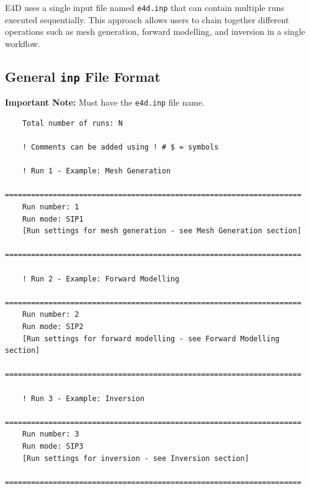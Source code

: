 \documentclass[a4paper,12pt]{article}
\begin{document}
E4D uses a single input file named \texttt{e4d.inp} that can contain multiple runs executed sequentially. This approach allows users to chain together different operations such as mesh generation, forward modelling, and inversion in a single workflow.

\subsection{General \texttt{inp} File Format}

\begin{framed}
    \noindent \textbf{Important Note:} Must have the \texttt{e4d.inp} file name.
\end{framed}

\begin{framed}
    \begin{verbatim}
    Total number of runs: N

    ! Comments can be added using ! # $ = symbols

    ! Run 1 - Example: Mesh Generation
    ====================================================================
    Run number: 1
    Run mode: SIP1
    [Run settings for mesh generation - see Mesh Generation section]
    ====================================================================

    ! Run 2 - Example: Forward Modelling
    ====================================================================
    Run number: 2
    Run mode: SIP2
    [Run settings for forward modelling - see Forward Modelling section]
    ====================================================================

    ! Run 3 - Example: Inversion
    ====================================================================
    Run number: 3
    Run mode: SIP3
    [Run settings for inversion - see Inversion section]
    ====================================================================
\end{verbatim}
\end{framed}
\end{document}
